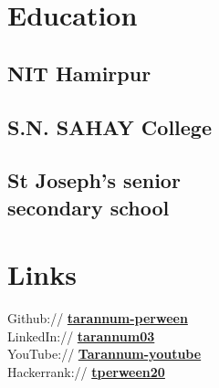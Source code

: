 \documentclass[]{deedy-resume-openfont}
\begin{document}
%
%     
%
\lastupdated

%
%

%
%

\begin{minipage}[t]{0.33\textwidth} 


\section{Education} 

\subsection{NIT Hamirpur}
\sectionsep

\subsection{S.N. SAHAY College}
\sectionsep

\subsection{St Joseph’s senior\\ secondary school}
\sectionsep





\section{Links} 
Github:// \href{https://github.com/tarannum-perween}{\bf tarannum-perween} \\
LinkedIn://  \href{https://www.linkedin.com/in/tarannum03}{\bf tarannum03} \\
YouTube://  \href{https://www.youtube.com/channel/UCpdDBBU4c_2ycT-BDL8OtoA}{\bf Tarannum-youtube} \\
Hackerrank:// \href{https://www.hackerrank.com/tperween20}{\bf tperween20}\\


\end{minipage}
\end{document}

